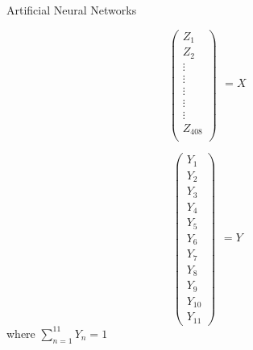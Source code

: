 \documentclass{beamer}
\begin{document}
\begin{frame}{Artificial Neural Networks}
\begin{minipage}[t]{0.5\textwidth}
$$
\begin{pmatrix}
Z_1\\ 
Z_2\\ 
\vdots \\ 
\vdots\\ 
\vdots\\ 
\vdots\\ 
\vdots\\ 
Z_{408}\\ 
\end{pmatrix}
\begin{matrix}
\\ 
\\ 
\\ 
\\ 
=X\\ 
\\ 
\\ 
\\ 
\\
\end{matrix}
$$
\end{minipage}\hfill
\begin{minipage}[t]{0.5\textwidth}
$$
\begin{pmatrix}
Y_1\\ 
Y_2\\ 
Y_3\\ 
Y_4\\ 
Y_5\\ 
Y_6\\ 
Y_7\\ 
Y_8\\ 
Y_{9}\\ 
Y_{10}\\
Y_{11}
\end{pmatrix}
\begin{matrix}
\\ 
\\ 
\\ 
\\ 
\\ 
=Y\\ 
\\ 
\\ 
\\ 
\\ 
\\ 
\end{matrix}
$$
where $\sum_{n=1}^{11}Y_n=1$
\end{minipage}
\end{frame}
\end{document}
